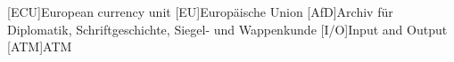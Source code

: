 \begin{acronym}[ECU]
[ECU]{European currency unit}
[EU]{Europäische Union}
[AfD]{Archiv für Diplomatik, Schriftgeschichte, Siegel- und Wappenkunde}
[I/O]{Input and Output}
[ATM]{ATM}
\end{acronym}

